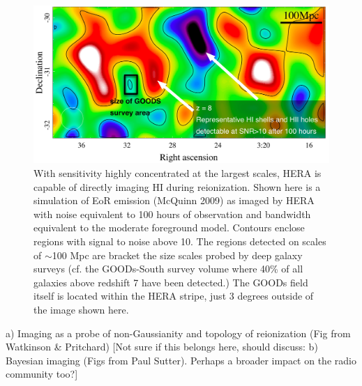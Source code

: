 \documentclass[preprint]{aastex}
\begin{document}
 
\begin{figure}[t]\centering
\includegraphics[width=\textwidth]{plots/Imaging/HERA_331_z8_SNR_annotated.jpg}
\caption{\small
With sensitivity highly concentrated at the largest scales, HERA is capable of directly imaging HI during reionization.  Shown here is a simulation of EoR emission (McQuinn 2009) as imaged by HERA with noise equivalent to 100 hours of observation and bandwidth equivalent to the moderate foreground model. %
Contours enclose regions with signal to noise above 10.  The regions detected on scales of $\sim$100 Mpc are bracket the size scales probed by deep galaxy surveys (cf. the GOODs-South survey volume where 40\% of all galaxies above redshift 7 have been detected.)  The GOODs field itself is located within the HERA stripe, just 3 degrees outside of the image shown here.
\label{fig:imaging}}
\end{figure}    
a) Imaging as a probe of non-Gaussianity and topology of reionization (Fig from Watkinson \& Pritchard)
[Not sure if this belongs here, should discuss: b) Bayesian imaging (Figs from Paul Sutter).  
Perhaps a broader impact on the radio community too?]
\end{document}
